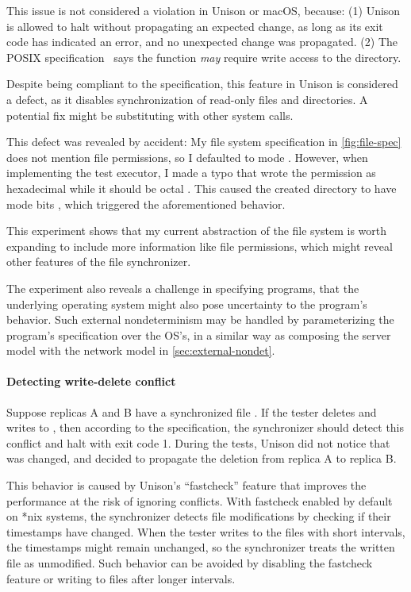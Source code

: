 This issue is not considered a violation in Unison or macOS, because: (1) Unison
is allowed to halt without propagating an expected change, as long as its exit
code has indicated an error, and no unexpected change was propagated.  (2) The
POSIX specification~\cite{posix} says the  function {\it may}
require write access to the directory.

Despite being compliant to the specification, this feature in Unison is
considered a defect, as it disables synchronization of read-only files and
directories.  A potential fix might be substituting  with other
system calls.

This defect was revealed by accident: My file system specification in
\autoref{fig:file-spec} does not mention file permissions, so I defaulted to
mode .  However, when implementing the test executor, I made a typo
that wrote the permission as hexadecimal  while it should be octal
.  This caused the created directory to have mode bits ,
which triggered the aforementioned behavior.

This experiment shows that my current abstraction of the file system is worth
expanding to include more information like file permissions, which might reveal
other features of the file synchronizer.

The experiment also reveals a challenge in specifying programs, that the
underlying operating system might also pose uncertainty to the program's
behavior.  Such external nondeterminism may be handled by parameterizing the
program's specification over the OS's, in a similar way as composing the server
model with the network model in \autoref{sec:external-nondet}.

\paragraph{Detecting write-delete conflict}
Suppose replicas \ilj A and \ilj B have a synchronized file .  If
the tester deletes  and writes to , then according
to the specification, the synchronizer should detect this conflict and halt with
exit code 1.  During the tests, Unison did not notice that  was
changed, and decided to propagate the deletion from replica \ilj A to replica
\ilj B.

This behavior is caused by Unison's ``fastcheck'' feature that improves the
performance at the risk of ignoring conflicts.  With fastcheck enabled by
default on *nix systems, the synchronizer detects file modifications by checking
if their timestamps have changed.  When the tester writes to the files with
short intervals, the timestamps might remain unchanged, so the synchronizer
treats the written file as unmodified.  Such behavior can be avoided by
disabling the fastcheck feature or writing to files after longer intervals.

